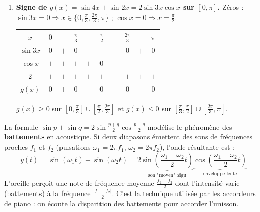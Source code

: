 \documentclass[11pt]{article}
\begin{document}
\begin{corrige}[Exercice n°1]
\begin{enumerate}
\begin{itemize}
\begin{itemize}
            Sur $[0, 2\pi[$ : $\frac{\pi}{12}, \frac{13\pi}{12}, \frac{5\pi}{12}, \frac{17\pi}{12}$.
        \end{itemize}
        Ensemble des solutions (trié) :
        \[
        \boxed{S = \left\{\frac{\pi}{12}, \frac{\pi}{6}, \frac{5\pi}{12}, \frac{\pi}{2}, \frac{5\pi}{6}, \frac{13\pi}{12}, \frac{7\pi}{6}, \frac{17\pi}{12}, \frac{3\pi}{2}, \frac{11\pi}{6}\right\}}
        \]
    \end{itemize}
    \item \textbf{Signe de $g(x) = \sin 4x + \sin 2x = 2 \sin 3x \cos x$ sur $[0, \pi]$.}
    Zéros : $\sin 3x=0 \Rightarrow x \in \{0, \frac{\pi}{3}, \frac{2\pi}{3}, \pi\}$ ; $\cos x=0 \Rightarrow x=\frac{\pi}{2}$.
    \begin{center}
    \begin{tabular}{|c|ccccccccc|}\hline
    $x$ & $0$ & & $\frac{\pi}{3}$ & & $\frac{\pi}{2}$ & & $\frac{2\pi}{3}$ & & $\pi$ \\ \hline
    $\sin 3x$ & $0$ & $+$ & $0$ & $-$ & $-$ & $-$ & $0$ & $+$ & $0$ \\
    $\cos x$ & $+$ & $+$ & $+$ & $+$ & $0$ & $-$ & $-$ & $-$ & $-$ \\
    $2$ & $+$ & $+$ & $+$ & $+$ & $+$ & $+$ & $+$ & $+$ & $+$ \\ \hline
    $g(x)$ & $0$ & $+$ & $0$ & $-$ & $0$ & $+$ & $0$ & $-$ & $0$ \\ \hline
    \end{tabular}
    \end{center}
    $g(x) \ge 0$ sur $\left[0, \frac{\pi}{3}\right] \cup \left[\frac{\pi}{2}, \frac{2\pi}{3}\right]$ et $g(x) \le 0$ sur $\left[\frac{\pi}{3}, \frac{\pi}{2}\right] \cup \left[\frac{2\pi}{3}, \pi\right]$.
\end{enumerate}
\end{corrige}

\begin{savaistu}
La formule $\sin p + \sin q = 2 \sin\frac{p+q}{2} \cos\frac{p-q}{2}$ modélise le phénomène des \textbf{battements} en acoustique. Si deux diapasons émettent des sons de fréquences proches $f_1$ et $f_2$ (pulsations $\omega_1=2\pi f_1$, $\omega_2=2\pi f_2$), l'onde résultante est :
\[
y(t) = \sin(\omega_1 t) + \sin(\omega_2 t) = 2 \underbrace{\sin\left(\frac{\omega_1+\omega_2}{2}t\right)}_{\text{son "moyen" aigu}} \underbrace{\cos\left(\frac{\omega_1-\omega_2}{2}t\right)}_{\text{enveloppe lente}}
\]
L'oreille perçoit une note de fréquence moyenne $\frac{f_1+f_2}{2}$ dont l'intensité varie (battements) à la fréquence $\frac{|f_1-f_2|}{2}$. C'est la technique utilisée par les accordeurs de piano : on écoute la disparition des battements pour accorder l'unisson.
\end{savaistu}
\end{document}
